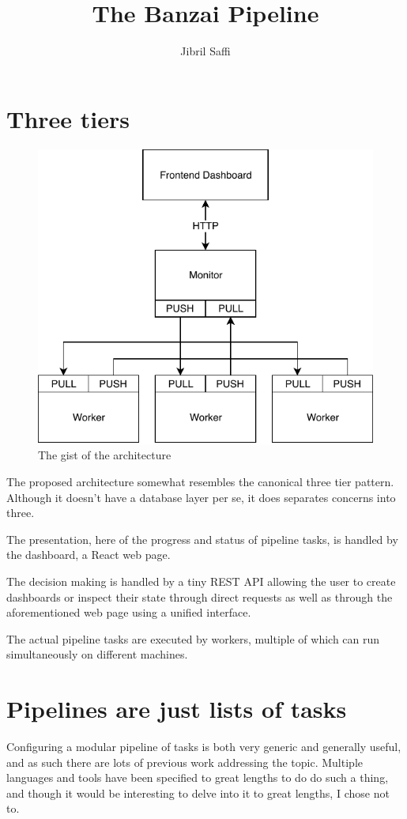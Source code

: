 \documentclass[12pt, a4paper]{article}
\title{The Banzai Pipeline}
\author{Jibril Saffi}
\begin{document}
\maketitle

\section{Three tiers}

\begin{figure}[htpb]
    \centering
    \includegraphics[width=0.6\linewidth]{arch.pdf}
    \caption{The gist of the architecture}
\end{figure}

The proposed architecture somewhat resembles the canonical three tier pattern.
Although it doesn't have a database layer per se, it does separates concerns into three.

The presentation, here of the progress and status of pipeline tasks, is handled by the dashboard, a React web page.

The decision making is handled by a tiny REST API allowing the user to create dashboards or inspect
their state through direct requests as well as through the aforementioned web page using a unified interface.

The actual pipeline tasks are executed by workers, multiple of which can run simultaneously on different machines.

\section{Pipelines are just lists of tasks}

Configuring a modular pipeline of tasks is both very generic and generally useful, and as such
there are lots of previous work addressing the topic.
Multiple languages and tools have been specified to great lengths to do do such a thing,
and though it would be interesting to delve into it to great lengths, I chose not to.
\end{document}
